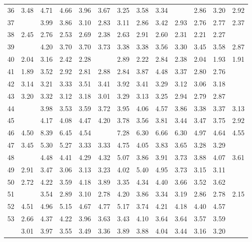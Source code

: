 \begin{tabular}{rrrrrrrrrrrrr}
  36 & 3.48 & 4.71 & 4.66 & 3.96 & 3.67 & 3.25 & 3.58 & 3.34 & \color{blue}{2.82} & 2.86 & 3.20 & 2.92 \\ 
  37 & \color{blue}{2.24} & 3.99 & 3.86 & 3.10 & 2.83 & 3.11 & 2.86 & 3.42 & 2.93 & 2.76 & 2.77 & 2.37 \\ 
  38 & 2.45 & 2.76 & 2.53 & 2.69 & 2.38 & 2.63 & 2.91 & 2.60 & 2.31 & 2.21 & 2.27 & \color{blue}{2.20} \\ 
  39 & \color{blue}{2.65} & 4.20 & 3.70 & 3.70 & 3.73 & 3.38 & 3.38 & 3.56 & 3.30 & 3.45 & 3.58 & 2.87 \\ 
  40 & 2.04 & 3.16 & 2.42 & 2.28 & \color{blue}{1.89} & 2.89 & 2.22 & 2.84 & 2.38 & 2.04 & 1.93 & 1.91 \\ 
  41 & 1.89 & 3.52 & 2.92 & 2.81 & 2.88 & 2.84 & 3.87 & 4.48 & 3.37 & 2.80 & 2.76 & \color{blue}{1.84} \\ 
  42 & 3.14 & 3.21 & 3.33 & 3.51 & 3.41 & 3.92 & 3.41 & 3.29 & 3.12 & 3.06 & 3.18 & \color{blue}{2.91} \\ 
  43 & 3.20 & 3.32 & 3.12 & 3.18 & 3.01 & 3.29 & 3.13 & 3.25 & 2.94 & 2.79 & 2.87 & \color{blue}{2.58} \\ 
  44 & \color{blue}{3.01} & 3.98 & 3.53 & 3.59 & 3.72 & 3.95 & 4.06 & 4.57 & 3.86 & 3.38 & 3.37 & 3.13 \\ 
  45 & \color{blue}{2.84} & 4.17 & 4.08 & 4.47 & 4.20 & 3.78 & 3.56 & 3.81 & 3.44 & 3.47 & 3.75 & 2.92 \\ 
  46 & 4.50 & 8.39 & 6.45 & 4.54 & \color{blue}{4.44} & 7.28 & 6.30 & 6.66 & 6.30 & 4.97 & 4.64 & 4.55 \\ 
  47 & 3.45 & 5.30 & 5.27 & 3.33 & 3.33 & 4.75 & 4.05 & 3.83 & 3.65 & 3.28 & 3.29 & \color{blue}{3.17} \\ 
  48 & \color{blue}{3.56} & 4.48 & 4.41 & 4.29 & 4.32 & 5.07 & 3.86 & 3.91 & 3.73 & 3.88 & 4.07 & 3.61 \\ 
  49 & 2.91 & 3.47 & 3.06 & 3.13 & 3.23 & 4.02 & 5.40 & 4.95 & 3.73 & 3.15 & 3.11 & \color{blue}{2.85} \\ 
  50 & 2.72 & 4.22 & 3.59 & 4.18 & 3.89 & 3.35 & 4.34 & 4.40 & 3.66 & 3.52 & 3.62 & \color{blue}{2.61} \\ 
  51 & \color{blue}{1.99} & 3.54 & 2.89 & 3.10 & 2.78 & 4.20 & 3.86 & 3.34 & 3.19 & 2.86 & 2.78 & 2.15 \\ 
  52 & 4.51 & 4.96 & 5.15 & 4.67 & 4.77 & 5.17 & 3.74 & 4.21 & 4.18 & 4.40 & 4.57 & \color{blue}{3.55} \\ 
  53 & 2.66 & 4.37 & 4.22 & 3.96 & 3.63 & 3.43 & 4.10 & 3.64 & 3.64 & 3.57 & 3.59 & \color{blue}{2.32} \\ 
   \hline
 & 3.01 & 3.97 & 3.55 & 3.49 & 3.36 & 3.89 & 3.88 & 4.04 & 3.44 & 3.16 & 3.20 & \color{blue}{2.82} \\ 
   \hline
\end{tabular}
